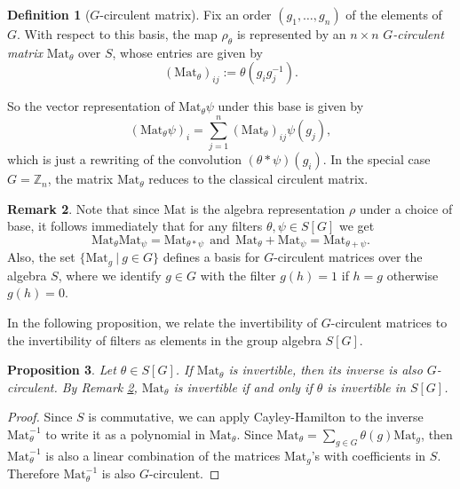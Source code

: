 \documentclass[final]{article}
\newcommand{\Mat}{\text{Mat}}
\newcommand{\conv}{\ast}
\theoremstyle{definition}
\newtheorem{definition}{Definition}[section] %
\newtheorem{remark}[definition]{Remark}
\theoremstyle{plain}
\newtheorem{proposition}[definition]{Proposition}
\begin{document}
\begin{definition}[$G$-circulent matrix]
Fix an order $(g_1,\dots,g_{n})$ of the elements of $G$. With respect to this basis, the map $\rho_\theta$ is represented by an $n \times n$ \emph{$G$-circulent matrix} $\Mat_\theta$ over $S$, whose entries are given by
\[
(\Mat_\theta)_{ij} := \theta(g_i g_j^{-1}).
\]

So the vector representation of $\Mat_\theta \psi$ under this base is given by
\[
(\Mat_\theta \psi)_i = \sum_{j = 1}^{n} (\Mat_\theta)_{ij} \psi(g_j),
\]
which is just a rewriting of the convolution $(\theta \conv \psi) (g_i)$.
In the special case $G = \mathbb{Z}_n$, the matrix $\Mat_\theta$ reduces to the classical circulent matrix.
\end{definition}

\begin{remark}\label{remark: Mat_is_rep}
    Note that since $\Mat$ is the algebra representation $\rho$ under a choice of base, it follows immediately that for any filters $\theta, \psi \in S[G]$ we get
    \[
    \Mat_\theta \Mat_\psi = \Mat_{\theta \conv \psi}\ \ \text{and}\ \ \Mat_\theta + \Mat_\psi = \Mat_{\theta + \psi}.
    \]
    Also, the set $\{\Mat_g\ |\ g\in G\}$ defines a basis for $G$-circulent matrices over the algebra $S$, where we identify $g\in G$ with the filter $g(h) = 1$ if $h=g$ otherwise $g(h)=0$.
\end{remark}

In the following proposition, we relate the invertibility of $G$-circulent matrices to the invertibility of filters as elements in the group algebra $S[G]$. 





\begin{proposition}
    Let $\theta \in S[G]$. If $\Mat_\theta$ is invertible, then its inverse is also $G$-circulent.
    By Remark \ref{remark: Mat_is_rep}, $\Mat_\theta$ is invertible if and only if $\theta$ is invertible in $S[G]$.
\end{proposition}
\begin{proof}
   Since $S$ is commutative, we can apply Cayley-Hamilton to the inverse $\Mat_\theta^{-1}$ to write it as a polynomial in $\Mat_\theta$.
    Since $\Mat_\theta = \sum_{g\in G}\theta(g)\Mat_g$, then $\Mat_\theta^{-1}$ is also a linear combination of the matrices $\Mat_g$'s with coefficients in $S$. Therefore $\Mat_\theta^{-1}$ is also $G$-circulent.
\end{proof}
\end{document}
